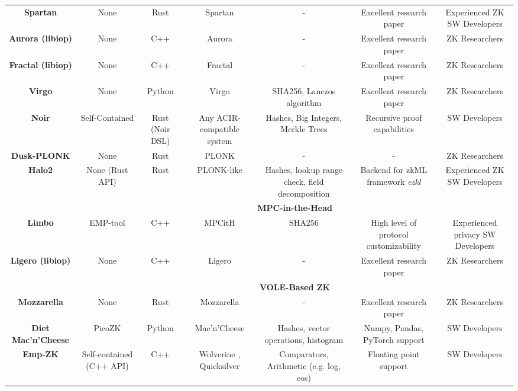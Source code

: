 \begin{sidewaystable*}[t!]
{\begin{tabular}{ccccccc}
   \textbf{Spartan \cite{Spartan}} & None & Rust & Spartan & - & Excellent research paper &  Experienced ZK SW Developers \\
   \textbf{Aurora (libiop) \cite{SciprLab2023Libiop}} & None  & C++ & Aurora & - & Excellent research paper & ZK Researchers \\
   \textbf{Fractal (libiop) \cite{SciprLab2023Libiop}} & None & C++ & Fractal & - & Excellent research paper & ZK Researchers \\
   \textbf{Virgo \cite{SunblazeUCB2023Virgo}} & None & Python & Virgo & SHA256, Lanczos algorithm & Excellent research paper &  ZK Researchers \\
   \textbf{Noir \cite{Noir2023Documentation}} & Self-Contained & Rust (Noir DSL) & Any ACIR-compatible system & Hashes, Big Integers, Merkle Trees & Recursive proof capabilities & SW Developers \\
   \textbf{Dusk-PLONK \cite{DuskPlonk2023Rust}} & None & Rust & PLONK & - & - & ZK Researchers \\
   \textbf{Halo2 \cite{Halo22023Book}} & None (Rust API) & Rust & PLONK-like & Hashes, lookup range check, field decomposition & Backend for zkML framework \textit{ezkl} \cite{ZkonduitInc2023EZKL} & Experienced ZK SW Developers \\

   \midrule
   & \multicolumn{6}{c}{\textbf{MPC-in-the-Head}} \\
   \midrule

   \textbf{Limbo \cite{KULeuvenCOSIC2023Limbo}} & EMP-tool \cite{emptool} & C++ & MPCitH & SHA256 & High level of protocol customizability & Experienced privacy SW Developers \\
   \textbf{Ligero (libiop) \cite{SciprLab2023Libiop}} & None & C++ & Ligero & - & Excellent research paper & ZK Researchers \\

   \midrule
   & \multicolumn{6}{c}{\textbf{VOLE-Based ZK}} \\
   \midrule
   \textbf{Mozzarella \cite{baum2022moz}} & None & Rust & Mozzarella & - & Excellent research paper & ZK Researchers \\
   \textbf{Diet Mac'n'Cheese \cite{dietmc}} & PicoZK & Python & Mac'n'Cheese \cite{baum2021mac} & Hashes, vector operations, histogram & Numpy, Pandas, PyTorch support & SW Developers \\
  \textbf{Emp-ZK \cite{empzk}} & Self-contained (C++ API) & C++ & Wolverine \cite{weng2021wolverine}, Quicksilver \cite{yang2021quicksilver} & Comparators, Arithmetic (e.g. log, cos) & Floating point support & SW Developers\\


\end{tabular}}
\end{sidewaystable*}
